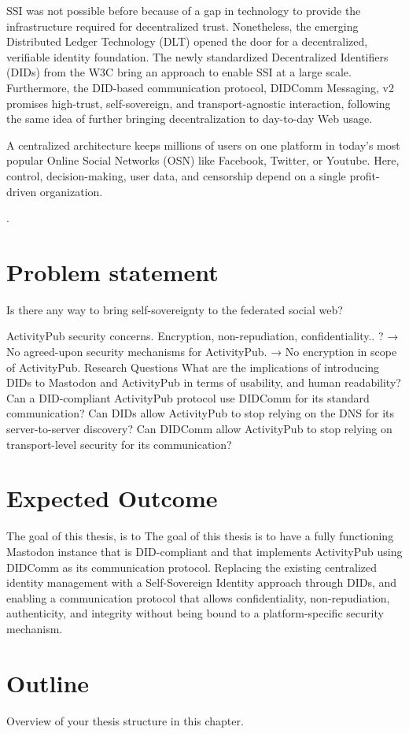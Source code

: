 SSI was not possible before because of a gap in technology to provide the infrastructure required for decentralized trust. Nonetheless, the emerging Distributed Ledger Technology (DLT) opened the door for a decentralized, verifiable identity foundation. The newly standardized Decentralized Identifiers (DIDs) from the W3C bring an approach to enable SSI at a large scale. Furthermore, the DID-based communication protocol, DIDComm Messaging, v2 promises high-trust, self-sovereign, and transport-agnostic interaction, following the same idea of further bringing decentralization to day-to-day Web usage.



A centralized architecture keeps millions of users on one platform in today's most popular Online Social Networks (OSN) like Facebook, Twitter, or Youtube. Here, control, decision-making, user data, and censorship depend on a single profit-driven organization.

.

 
\section{Problem statement}
 
 Is there any way to bring self-sovereignty to the federated social web? \cite{webber_sporny_2017}
 
ActivityPub security concerns. Encryption, non-repudiation, confidentiality.. ? 
→ No agreed-upon security mechanisms for ActivityPub. 
→ No encryption in scope of ActivityPub.
Research Questions
What are the implications of introducing DIDs to Mastodon and ActivityPub in terms of usability, and human readability?
Can a DID-compliant ActivityPub protocol use DIDComm for its standard communication?
Can DIDs allow ActivityPub to stop relying on the DNS for its server-to-server discovery?
Can DIDComm allow ActivityPub to stop relying on transport-level security for its communication?

\section{Expected Outcome}
The goal of this thesis, is to 
The goal of this thesis is to have a fully functioning Mastodon instance that is DID-compliant and that implements ActivityPub using DIDComm as its communication protocol. 
Replacing the existing centralized identity management with a Self-Sovereign Identity approach through DIDs, and enabling a communication protocol that allows confidentiality, non-repudiation, authenticity, and integrity without being bound to a platform-specific security mechanism.
 
\section{Outline}
Overview of your thesis structure in this chapter.
